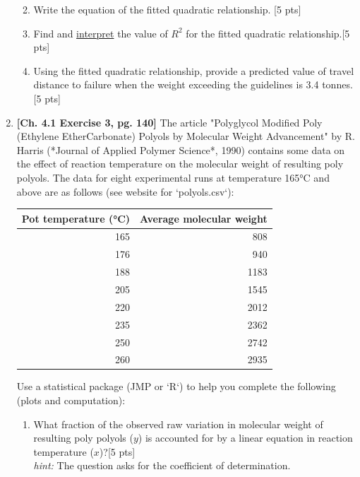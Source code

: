 \documentclass[11pt]{article}\usepackage[]{graphicx}\usepackage[]{color}
\begin{document}
\begin{enumerate}
\begin{enumerate}
\vspace{0.3cm}
       \item Write the equation of the fitted quadratic relationship. [5 pts]
       \item Find and \underline{interpret} the value of $R^2$ for the fitted quadratic relationship.[5 pts]
       \item Using the fitted quadratic relationship, provide a predicted value of travel distance to failure when the weight exceeding the guidelines is 3.4 tonnes.[5 pts]

\end{enumerate}




	
	\item \textbf{[Ch. 4.1 Exercise 3, pg. 140]} The article "Polyglycol Modified Poly (Ethylene EtherCarbonate) Polyols by Molecular Weight Advancement" by R. Harris (*Journal of Applied Polymer Science*, 1990) contains some data on the effect of reaction temperature on the molecular weight of resulting poly polyols. The data for eight experimental runs at temperature 165°C and above are as follows (see website for `polyols.csv`):
\begin{center}
\begin{tabular}{r|r}
    \hline
    Pot temperature (°C) & Average molecular weight\\
    \hline
    165 & 808\\
    \hline
    176 & 940\\
    \hline
    188 & 1183\\
    \hline
    205 & 1545\\
    \hline
    220 & 2012\\
    \hline
    235 & 2362\\
    \hline
    250 & 2742\\
    \hline
    260 & 2935\\
    \hline
\end{tabular}
\end{center}
	
Use a statistical package (JMP or `R`) to help you complete the following (plots and computation):

   \begin{enumerate} 
    \item What fraction of the observed raw variation in molecular weight of resulting poly polyols ($y$) is accounted for by a linear equation in reaction temperature ($x$)?[5 pts]\\
    \emph{hint:} The question asks for the coefficient of determination.
    

\end{enumerate}
\end{enumerate}
\end{document}
